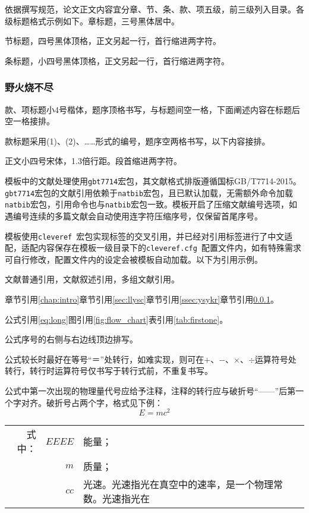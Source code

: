 依据撰写规范，论文正文内容宜分章、节、条、款、项五级，前三级列入目录。各级标题格式示例如下。章标题，三号黑体居中。

\label{sec:llysc}
节标题，四号黑体顶格，正文另起一行，首行缩进两字符。

\label{ssec:ysykr}
条标题，小四号黑体顶格，正文另起一行，首行缩进两字符。
\subsubsection{野火烧不尽}\label{sssec:yhsbj}
款、项标题小4号楷体，题序顶格书写，与标题间空一格，下面阐述内容在标题后空一格接排。

款标题采用(1)、(2)、……形式的编号，题序空两格书写，以下内容接排。

正文小四号宋体，1.3倍行距。段首缩进两字符。

模板中的文献处理使用\verb|gbt7714|宏包，其文献格式排版遵循国标GB/T7714-2015。\verb|gbt7714|宏包的文献引用依赖于\verb|natbib|宏包，且已默认加载，无需额外命令加载\verb|natbib|宏包，引用命令也与\verb|natbib|宏包一致。模板开启了压缩文献编号选项，如遇编号连续的多篇文献会自动使用连字符压缩序号，仅保留首尾序号。

模板使用\verb|cleveref|~宏包实现标签的交叉引用，并已经对引用标签进行了中文适配，适配内容保存在模板一级目录下的\verb|cleveref.cfg|~配置文件内，如有特殊需求可自行修改，配置文件内的设定会被模板自动加载。以下为引用示例。

文献普通引用\cite{同鸣2012}，文献叙述引用\citet{Boutsidis2011}，多组文献引用\cite{同鸣2012, Lee1999, Tang2013, Ding2006Orthogonal}。

章节引用\cref{chap:intro}章节引用\cref{sec:llysc}章节引用\cref{ssec:ysykr}章节引用\cref{sssec:yhsbj}。

公式引用\cref{eq:long}图引用\cref{fig:flow_chart}表引用\cref{tab:firstone}。

公式序号的右侧与右边线顶边排写。

公式较长时最好在等号“＝”处转行，如难实现，则可在$ + $、$ - $、$ \times $、$ \div $运算符号处转行，转行时运算符号仅书写于转行式前，不重复书写。

公式中第一次出现的物理量代号应给予注释，注释的转行应与破折号“——\nobreak”后第一个字对齐。破折号占两个字，格式见下例：
\begin{equation}\label{eq:norm}
E=mc^2
\end{equation}
\begin{flushleft}
    \begin{tabularx}{\textwidth}{@{}rr@{~——~}X@{}}
     式中：& $ EEEE $ & 能量； \\
          & $ m $    & 质量； \\
          & $ cc $   & 光速。光速指光在真空中的速率，是一个物理常数。光速指光在
    \end{tabularx}
\end{flushleft}

